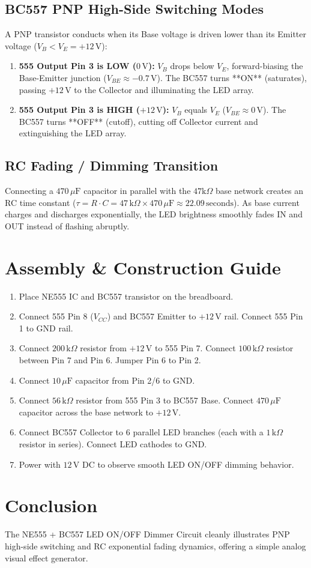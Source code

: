 \documentclass[11pt,a4paper]{article}
\begin{document}
\subsection{BC557 PNP High-Side Switching Modes}
A PNP transistor conducts when its Base voltage is driven lower than its Emitter voltage ($V_B < V_E = +12\,\text{V}$):
\begin{enumerate}
    \item \textbf{555 Output Pin 3 is LOW ($0\,\text{V}$):}
    $V_B$ drops below $V_E$, forward-biasing the Base-Emitter junction ($V_{BE} \approx -0.7\,\text{V}$). The BC557 turns **ON** (saturates), passing $+12\,\text{V}$ to the Collector and illuminating the LED array.
    \item \textbf{555 Output Pin 3 is HIGH ($+12\,\text{V}$):}
    $V_B$ equals $V_E$ ($V_{BE} \approx 0\,\text{V}$). The BC557 turns **OFF** (cutoff), cutting off Collector current and extinguishing the LED array.
\end{enumerate}

\subsection{RC Fading / Dimming Transition}
Connecting a $470\,\mu\text{F}$ capacitor in parallel with the $47\text{k}\Omega$ base network creates an RC time constant ($\tau = R \cdot C = 47\,\text{k}\Omega \times 470\,\mu\text{F} \approx 22.09\,\text{seconds}$). As base current charges and discharges exponentially, the LED brightness smoothly fades IN and OUT instead of flashing abruptly.

\section{Assembly \& Construction Guide}
\begin{enumerate}
    \item Place NE555 IC and BC557 transistor on the breadboard.
    \item Connect 555 Pin 8 ($V_{CC}$) and BC557 Emitter to $+12\,\text{V}$ rail. Connect 555 Pin 1 to GND rail.
    \item Connect $200\,\text{k}\Omega$ resistor from $+12\,\text{V}$ to 555 Pin 7. Connect $100\,\text{k}\Omega$ resistor between Pin 7 and Pin 6. Jumper Pin 6 to Pin 2.
    \item Connect $10\,\mu\text{F}$ capacitor from Pin 2/6 to GND.
    \item Connect $56\,\text{k}\Omega$ resistor from 555 Pin 3 to BC557 Base. Connect $470\,\mu\text{F}$ capacitor across the base network to $+12\,\text{V}$.
    \item Connect BC557 Collector to 6 parallel LED branches (each with a $1\,\text{k}\Omega$ resistor in series). Connect LED cathodes to GND.
    \item Power with $12\,\text{V}$ DC to observe smooth LED ON/OFF dimming behavior.
\end{enumerate}

\section{Conclusion}
The NE555 + BC557 LED ON/OFF Dimmer Circuit cleanly illustrates PNP high-side switching and RC exponential fading dynamics, offering a simple analog visual effect generator.
\end{document}

